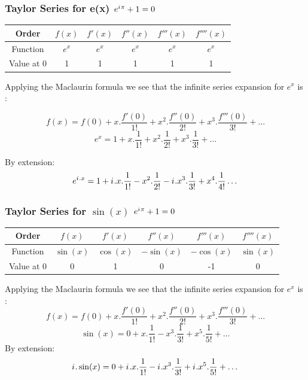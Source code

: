 \documentclass[10pt]{beamer}
\newcommand{\iu}{{i\mkern1mu}}
\begin{document}
\begin{frame}
	\frametitle{Taylor Series for e(x) \hspace{25pt} \textcolor{pink}{\Huge\(e^{\iu \pi} +1 = 0\)}}
	\begin{center}
		\begin{tabular}{|c|c|c|c|c|c|}
			\hline
			Order &$f(x)$ & $f'(x)$ & $f''(x)$ & $f'''(x)$ & $f''''(x)$ \\
			\hline
			Function & $e^x$  & $e^x$   & $e^x$    & $e^x$     & $e^x$      \\
			\hline
			Value at 0 & 1      & 1       & 1        & 1         & 1          \\
			\hline
		\end{tabular}
	\end{center}
	\vspace{20pt}
	Applying the Maclaurin formula we see that the infinite series expansion for $e^x$ is :

	{\large $$f(x) = f(0)+x.\dfrac{f'(0)}{1!}+ x^2.\dfrac{f''(0)}{2!} +x^3.\dfrac{f'''(0)}{3!} + \dots$$
	\large $$e^x = 1+x.\dfrac{1}{1!}+ x^2.\dfrac{1}{2!} +x^3.\dfrac{1}{3!} + \dots$$}

	By extension:
	{\large $$e^{{\iu}.x} = 1+\iu.x.\dfrac{1}{1!}- x^2.\dfrac{1}{2!} -\iu.x^3.\dfrac{1}{3!} + x^4.\dfrac{1}{4!} \dots$$}
\end{frame}

\begin{frame}
	\frametitle{Taylor Series for $\sin(x)$ \hspace{25pt} \textcolor{pink}{\Huge\(e^{\iu \pi} +1 = 0\)}}
	\begin{center}
		\begin{tabular}{|c|c|c|c|c|c|}
			\hline
			Order & \(f(x)\)    & \(f'(x)\)   & \(f''(x)\)   & \(f'''(x)\)  & \(f''''(x)\) \\
			\hline
			Function & \(\sin(x)\) & \(\cos(x)\) & \(-\sin(x)\) & \(-\cos(x)\) & \(\sin(x)\)  \\
			\hline
			Value at 0 & 0           & 1           & 0            & -1           & 0            \\
			\hline
		\end{tabular}
	\end{center}
	\vspace{20pt}
	Applying the Maclaurin formula we see that the infinite series expansion for $e^x$ is :
	{\large $$f(x) = f(0)+x.\dfrac{f'(0)}{1!}+ x^2.\dfrac{f''(0)}{2!} +x^3.\dfrac{f'''(0)}{3!} + \dots$$
	\large $$\sin(x) = 0+x.\dfrac{1}{1!} -x^3.\dfrac{1}{3!} + x^5.\dfrac{1}{5!} +\dots$$}	
	By extension: 
	{\large $$\iu.\sin(x) = 0+\iu.x.\dfrac{1}{1!} -\iu.x^3.\dfrac{1}{3!} + \iu.x^5.\dfrac{1}{5!} +\dots$$}

\end{frame}
\end{document}
